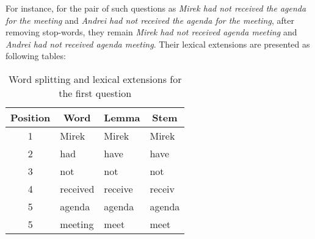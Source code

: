 For instance, for the pair of such questions as \textit{Mirek had not received the agenda for the meeting} and \textit{Andrei had not received the agenda for the meeting}, after removing stop-words, they remain \textit{Mirek had not received agenda meeting} and \textit{Andrei had not received agenda meeting}. Their lexical extensions are presented as following tables:


\begin{table}[htbp]
\scriptsize
\begin{center}
\caption{Word splitting and lexical extensions for the first question}
\begin{tabular}{|c|l|l|l|}
\hline
\textbf{Position} & \multicolumn{1}{c|}{\textbf{Word}} & \multicolumn{1}{c|}{\textbf{Lemma}} & \multicolumn{1}{c|}{\textbf{Stem}} \\ \hline
1 & Mirek & Mirek & Mirek \\ \hline
2 & had & have & have \\ \hline
3 & not & not & not \\ \hline
4 & received & receive & receiv \\ \hline
5 & agenda & agenda & agenda \\ \hline
5 & meeting & meet & meet \\ \hline
\end{tabular}
\label{question1}
\end{center}
\end{table}



